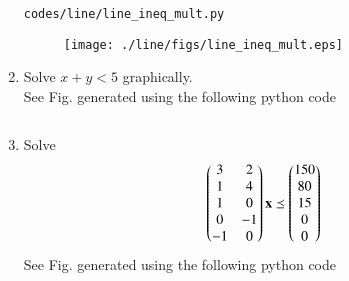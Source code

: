\begin{enumerate}[label=\arabic*.,ref=\thesubsection.\theenumi]
\begin{lstlisting}
codes/line/line_ineq_mult.py
\end{lstlisting}
%
\begin{figure}[!ht]
\texttt{[image: ./line/figs/line\_ineq\_mult.eps]}
\caption{}
\label{fig:line_ineq_mult}
\end{figure}
%
\item   Solve    $x+y < 5$ graphically.
\\
\solution  See Fig.  generated using the following python code
\begin{lstlisting}
\end{lstlisting}
%
    \item Solve 
\begin{align}
\begin{pmatrix}3 & 2 \\ 1 & 4 \\ 1 & 0 \\ 0 & -1 \\ -1 & 0\end{pmatrix} \mathbf{x}\preceq \begin{pmatrix}150\\80\\15\\0\\0\end{pmatrix}
\end{align}
%
\solution  
See Fig.  generated using the following python code
\begin{lstlisting}
\end{lstlisting}
   
    \end{enumerate}
